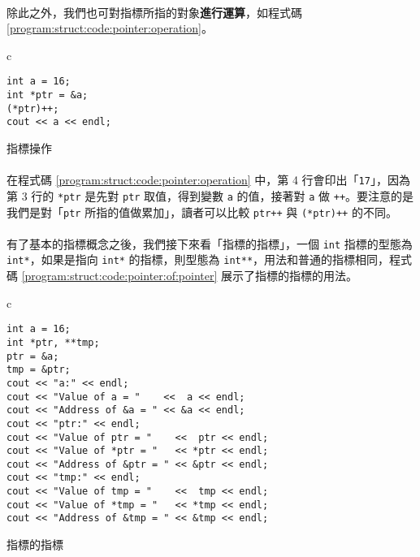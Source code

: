 \documentclass[12pt,a4paper,oneside]{article}
\begin{document}
\begin{CJK}{UTF8}{bkai}
\paragraph{}除此之外，我們也可對指標所指的對象\textbf{進行運算}，如程式碼 \ref{program:struct:code:pointer:operation}。

\begin{code}[h!]
\centering
\begin{tabular}{c}
\begin{lstlisting}
int a = 16;
int *ptr = &a;
(*ptr)++;
cout << a << endl;
\end{lstlisting}
\end{tabular}
\caption{指標操作}
\label{program:struct:code:pointer:operation}
\end{code}

\paragraph{}在程式碼 \ref{program:struct:code:pointer:operation} 中，第 4 行會印出「\lstinline!17!」，因為第 3 行的 \lstinline!*ptr! 是先對 \lstinline!ptr! 取值，得到變數 \lstinline!a! 的值，接著對 \lstinline!a! 做 \lstinline!++!。要注意的是我們是對「\lstinline!ptr! 所指的值做累加」，讀者可以比較 \lstinline!ptr++! 與 \lstinline!(*ptr)++! 的不同。

\paragraph{}有了基本的指標概念之後，我們接下來看「指標的指標」，一個 \lstinline!int! 指標的型態為 \lstinline!int*!，如果是指向 \lstinline!int*! 的指標，則型態為 \lstinline!int**!，用法和普通的指標相同，程式碼 \ref{program:struct:code:pointer:of:pointer} 展示了指標的指標的用法。

\begin{code}[h!]
\centering
\begin{tabular}{c}
\begin{lstlisting}
int a = 16;
int *ptr, **tmp;
ptr = &a;
tmp = &ptr;
cout << "a:" << endl;
cout << "Value of a = "    <<  a << endl;
cout << "Address of &a = " << &a << endl;
cout << "ptr:" << endl;
cout << "Value of ptr = "    <<  ptr << endl;
cout << "Value of *ptr = "   << *ptr << endl;
cout << "Address of &ptr = " << &ptr << endl;
cout << "tmp:" << endl;
cout << "Value of tmp = "    <<  tmp << endl;
cout << "Value of *tmp = "   << *tmp << endl;
cout << "Address of &tmp = " << &tmp << endl;
\end{lstlisting}
\end{tabular}
\caption{指標的指標}
\label{program:struct:code:pointer:of:pointer}
\end{code}


\end{CJK}
\end{document}
